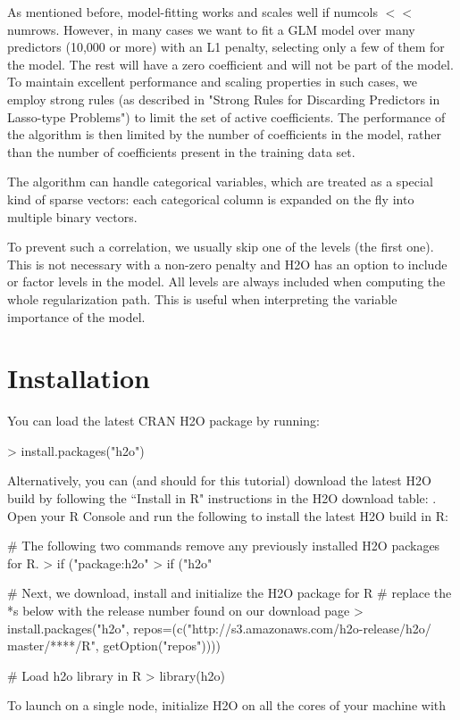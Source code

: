 \documentclass[11pt]{article}
\begin{document}
As mentioned before, model-fitting works and scales well if numcols $<<$ numrows. However, in many cases we want to fit a GLM model over many predictors (10,000 or more) with an L1 penalty, selecting only a few of them for the model. The rest will have a zero coefficient and will not be part of the model. To maintain excellent performance and scaling properties in such cases, we employ strong rules  (as described in "Strong Rules for Discarding Predictors in Lasso-type Problems") to limit the set of active coefficients. The performance of the algorithm is then limited by the number of coefficients in the model, rather than the number of coefficients present in the training data set. 

The algorithm can handle categorical variables, which are treated as a special kind of sparse vectors: each categorical column is expanded on the fly into multiple binary vectors. 



To prevent such a correlation, we usually skip one of the levels (the first one). This is not necessary with a non-zero penalty and H2O has an option to include or factor levels in the model. All levels are always included when computing the whole regularization path. This is useful when interpreting the variable importance of the model. 

\section{Installation} 

You can load the latest CRAN H2O package by running:

\begin{spverbatim}
> install.packages("h2o")
\end{spverbatim}
\bigskip
\noindent
Alternatively, you can (and should for this tutorial) download the latest H2O build by following the ``Install in R" instructions in the H2O download table:
. Open your R Console and run the following to install the latest H2O build in R:

\begin{spverbatim}
# The following two commands remove any previously installed H2O packages for R.
> if ("package:h2o" %
> if ("h2o" %

# Next, we download, install and initialize the H2O package for R
# replace the *s below with the release number found on our download page
> install.packages("h2o", repos=(c("http://s3.amazonaws.com/h2o-release/h2o/
master/****/R", getOption("repos"))))

# Load h2o library in R
> library(h2o)

\end{spverbatim}
\noindent
To launch on a single node, initialize H2O on all the cores of your machine with
\end{document}
